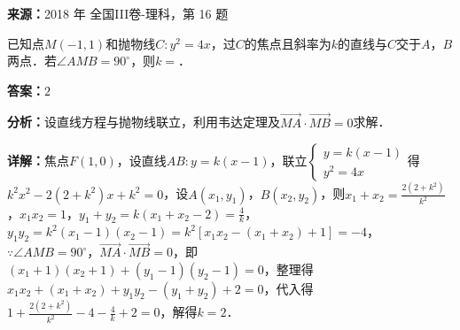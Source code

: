 \begin{question}[points=5]
\textbf{来源：}2018 年 全国III卷-理科，第 16 题\par
已知点$M(-1,1)$和抛物线$C:y^2=4x$，过$C$的焦点且斜率为$k$的直线与$C$交于$A$，$B$两点．若$\angle AMB=90^\circ$，则$k=$．
\fillin[{$2$}]
\begin{solution}
\textbf{答案：}$2$

\textbf{分析：}设直线方程与抛物线联立，利用韦达定理及$\overrightarrow{MA}\cdot\overrightarrow{MB}=0$求解．

\textbf{详解：}焦点$F(1,0)$，设直线$AB:y=k(x-1)$，联立$\begin{cases}y=k(x-1)\\y^2=4x\end{cases}$得$k^2x^2-2(2+k^2)x+k^2=0$，设$A(x_1,y_1)$，$B(x_2,y_2)$，则$x_1+x_2=\frac{2(2+k^2)}{k^2}$，$x_1x_2=1$，$y_1+y_2=k(x_1+x_2-2)=\frac{4}{k}$，$y_1y_2=k^2(x_1-1)(x_2-1)=k^2[x_1x_2-(x_1+x_2)+1]=-4$，$\because \angle AMB=90^\circ$，$\overrightarrow{MA}\cdot\overrightarrow{MB}=0$，即$(x_1+1)(x_2+1)+(y_1-1)(y_2-1)=0$，整理得$x_1x_2+(x_1+x_2)+y_1y_2-(y_1+y_2)+2=0$，代入得$1+\frac{2(2+k^2)}{k^2}-4-\frac{4}{k}+2=0$，解得$k=2$．
\end{solution}
\end{question}

